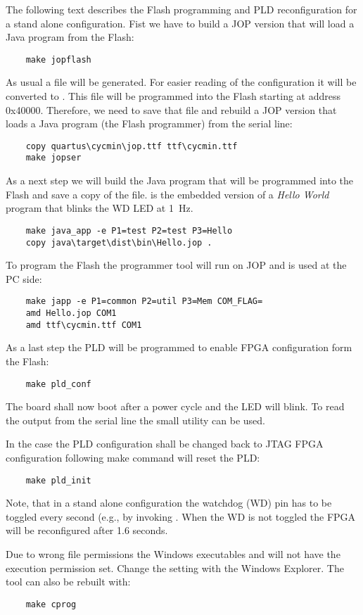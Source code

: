 The following text describes the Flash programming and PLD
reconfiguration for a stand alone configuration. Fist we have to
build a JOP version that will load a Java program from the Flash:
\begin{verbatim}
    make jopflash
\end{verbatim}
As usual a  file will be generated. For easier reading
of the configuration it will be converted to . This
file will be programmed into the Flash starting at address 0x40000.
Therefore, we need to save that file and rebuild a JOP version that
loads a Java program (the Flash programmer) from the serial line:
\begin{verbatim}
    copy quartus\cycmin\jop.ttf ttf\cycmin.ttf
    make jopser
\end{verbatim}
As a next step we will build the Java program that will be programmed
into the Flash and save a copy of the  file.
 is the embedded version of a \emph{Hello World}
program that blinks the WD LED at 1~Hz.
\begin{verbatim}
    make java_app -e P1=test P2=test P3=Hello
    copy java\target\dist\bin\Hello.jop .
\end{verbatim}
To program the Flash the programmer tool  will run on
JOP and  is used at the PC side:
\begin{verbatim}
    make japp -e P1=common P2=util P3=Mem COM_FLAG=
    amd Hello.jop COM1
    amd ttf\cycmin.ttf COM1
\end{verbatim}
As a last step the PLD will be programmed to enable FPGA
configuration form the Flash:
\begin{verbatim}
    make pld_conf
\end{verbatim}
The board shall now boot after a power cycle and the LED will blink.
To read the output from the serial line the small utility
 can be used.


In the case the PLD configuration shall be changed back to JTAG FPGA
configuration following make command will reset the PLD:
\begin{verbatim}
    make pld_init
\end{verbatim}

Note, that in a stand alone configuration the watchdog (WD) pin has
to be toggled every second (e.g., by invoking .
When the WD is not toggled the FPGA will be reconfigured after 1.6
seconds.

Due to wrong file permissions the Windows executables 
and  will not have the execution permission set.
Change the setting with the Windows Explorer. The tool 
can also be rebuilt with:
\begin{verbatim}
    make cprog
\end{verbatim}


